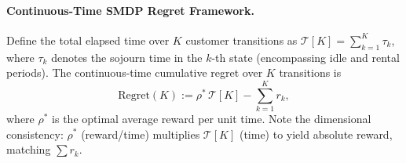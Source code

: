 \documentclass[letterpaper, 10 pt, conference]{IEEEconf}
\begin{document}
\paragraph{Continuous-Time SMDP Regret Framework.}
Define the total elapsed time over $K$ customer transitions as $\mathcal{T}[K] = \sum_{k=1}^K \tau_k$, where $\tau_k$ denotes the sojourn time in the $k$-th state (encompassing idle and rental periods). The continuous-time cumulative regret over $K$ transitions is
\begin{equation}
    \label{eq:ct_regret}
    \mathrm{Regret}(K) := \rho^*\,\mathcal{T}[K] - \sum_{k=1}^K r_k,
\end{equation}
where $\rho^*$ is the optimal average reward per unit time. Note the dimensional consistency: $\rho^*$ (reward/time) multiplies $\mathcal{T}[K]$ (time) to yield absolute reward, matching $\sum r_k$.
\end{document}
